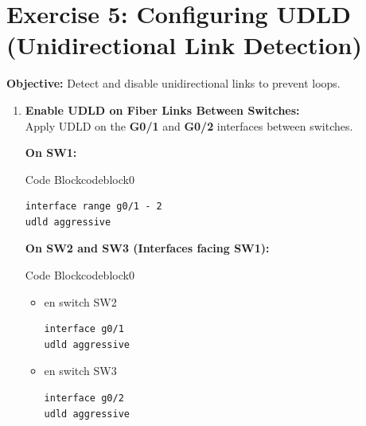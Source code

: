 \documentclass[a4paper]{book}
\begin{document}
\section*{Exercise 5: Configuring UDLD (Unidirectional Link Detection)}

\textbf{Objective:} Detect and disable unidirectional links to prevent loops.

\begin{enumerate}
	\item \textbf{Enable UDLD on Fiber Links Between Switches:} \\
	      Apply UDLD on the \textbf{G0/1} and \textbf{G0/2} interfaces between switches.

	      \textbf{On SW1:}



	      \begin{ocg}{Code Block}{codeblock}{0}
		      \vspace{0.5cm}
		      \begin{lstlisting}
interface range g0/1 - 2
udld aggressive
    \end{lstlisting}
	      \end{ocg}

	      \textbf{On SW2 and SW3 (Interfaces facing SW1):}



	      \begin{ocg}{Code Block}{codeblock}{0}
		      \vspace{0.5cm}
		      \begin{itemize}
			      \item en switch SW2
			            \begin{lstlisting}
interface g0/1
udld aggressive
                \end{lstlisting}
			      \item en switch SW3
			            \begin{lstlisting}
interface g0/2
udld aggressive
                \end{lstlisting}
		      \end{itemize}
	      \end{ocg}


\end{enumerate}
\end{document}
